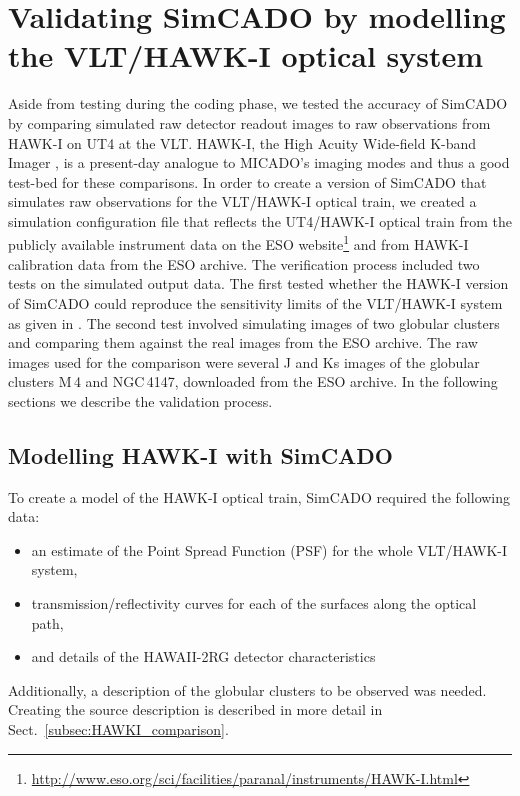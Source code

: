 \section{Validating SimCADO by modelling the VLT/HAWK-I optical system}
\label{sec:hawki}

Aside from testing during the coding phase, we tested the accuracy of SimCADO by comparing simulated raw detector readout images to raw observations from HAWK-I on UT4 at the VLT. HAWK-I, the High Acuity Wide-field K-band Imager \citep{hawki}, is a present-day analogue to MICADO's imaging modes and thus a good test-bed for these comparisons. In order to create a version of SimCADO that simulates raw observations for the VLT/HAWK-I optical train, we created a simulation configuration file that reflects the UT4/HAWK-I optical train from the publicly available instrument data on the ESO website\footnote{\url{http://www.eso.org/sci/facilities/paranal/instruments/HAWK-I.html}} and from HAWK-I calibration data from the ESO archive. The verification process included two tests on the simulated output data. The first tested whether the HAWK-I version of SimCADO could reproduce the sensitivity limits of the VLT/HAWK-I system as given in \citet{hawki}. The second test involved simulating images of two globular clusters and comparing them against the real images from the ESO archive. The raw images used for the comparison were several J and Ks images of the globular clusters M\,4 and NGC\,4147, downloaded from the ESO archive. In the following sections we describe the validation process.

\subsection{Modelling HAWK-I with SimCADO}

To create a model of the HAWK-I optical train, SimCADO required the following data:
\begin{itemize}
    \item an estimate of the Point Spread Function (PSF) for the whole VLT/HAWK-I system,
    \item transmission/reflectivity curves for each of the surfaces along the optical path, 
    \item and details of the HAWAII-2RG detector characteristics
\end{itemize}

Additionally, a description of the globular clusters to be observed was needed. Creating the source description is described in more detail in Sect.~\ref{subsec:HAWKI_comparison}.

